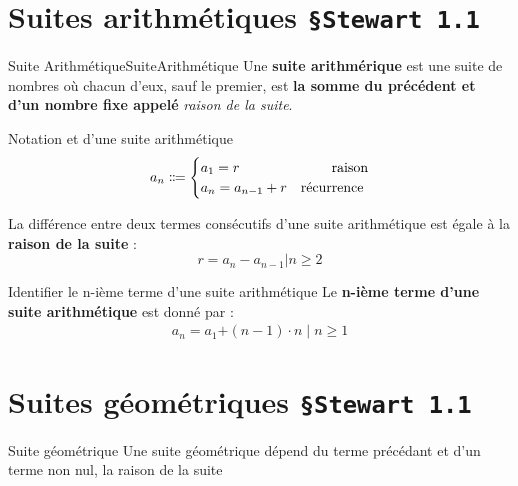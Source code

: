 \documentclass[16pt]{report}
\begin{document}
\begin{multicols*}{2}
    
    \section{Suites arithmétiques \quad \texttt{\S Stewart 1.1}}
    \begin{Definitionx}{Suite Arithmétique}{SuiteArithmétique}
        Une \textbf{suite arithmérique} est une suite de nombres où chacun 
        d'eux, sauf le premier, est \textbf{la somme du précédent et d'un 
        nombre fixe appelé} \textit{raison de la suite}. 
    \end{Definitionx}

    \begin{Syntaxe}{Notation et d'une suite arithmétique}{}
        \begin{align*}
                a_n \Coloneqq 
                \begin{cases}
                    a_1 = r  &\omit\hfill raison\\  
                    a_{n} = a_{n-1} + r &\omit\hfill récurrence
                \end{cases}
        \end{align*}

    \end{Syntaxe}

    \begin{note}{}{}
        La différence entre deux termes consécutifs d'une suite 
        arithmétique est égale à la \textbf{raison de la suite} : 
        \[ r = a_n - a_{n-1} | n \geq 2 \]
    \end{note}

    \begin{Concept}{Identifier le n-ième terme d'une suite arithmétique}{}
        Le \textbf{n-ième terme d'une suite arithmétique} est donné par : 
        \begin{align*}
          a_n = a_1 \text{+} \left(n - 1\right)\cdot{n}  \; | \; n \geq 1 
        \end{align*}
    \end{Concept}


    \section{Suites géométriques \quad \texttt{\S Stewart 1.1}  }
    \begin{Definitionx}{Suite géométrique}{}
    Une suite géométrique dépend du terme précédant et 
    d'un terme non nul, la raison de la suite 
    \end{Definitionx}



\end{multicols*}
\end{document}
